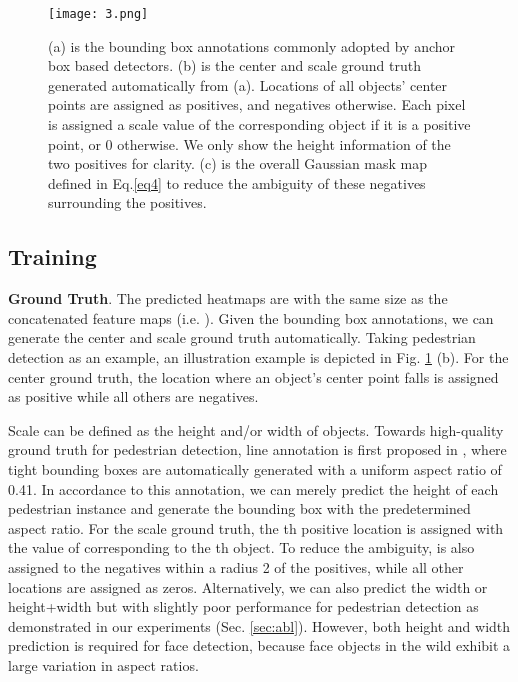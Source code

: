 \begin{figure}[t]
\begin{center}
\texttt{[image: 3.png]}
\end{center}
   \caption{(a) is the bounding box annotations commonly adopted by anchor box based detectors. (b) is the center and scale ground truth generated automatically from (a). Locations of all objects' center points are assigned as positives, and negatives otherwise. Each pixel is assigned a scale value of the corresponding object if it is a positive point, or 0 otherwise. We only show the height information of the two positives for clarity. (c) is the overall Gaussian mask map  defined in Eq.\ref{eq4} to reduce the ambiguity of these negatives surrounding the positives.}
\label{fig:gt}
\end{figure}
\subsection{Training}
\textbf{Ground Truth}.
The predicted heatmaps are with the same size as the concatenated feature maps (i.e.  ). Given the bounding box annotations, we can generate the center and scale ground truth automatically. Taking pedestrian detection as an example, an illustration example is depicted in Fig. \ref{fig:gt} (b). For the center ground truth, the location where an object's center point falls is assigned as positive while all others are negatives.

Scale can be defined as the height and/or width of objects.
Towards high-quality ground truth for pedestrian detection, line annotation is first proposed in \cite{zhang2018towards,zhang2017citypersons}, where tight bounding boxes are automatically generated with a uniform aspect ratio of 0.41. In accordance to this annotation, we can merely predict the height of each pedestrian instance and generate the bounding box with the predetermined aspect ratio. For the scale ground truth, the th positive location is assigned with the value of  corresponding to the th object. To reduce the ambiguity,  is also assigned to the negatives within a radius 2 of the positives, while all other locations are assigned as zeros.
Alternatively, we can also predict the width or height+width but with slightly poor performance for pedestrian detection as demonstrated in our experiments (Sec. \ref{sec:abl}). However, both height and width prediction is required for face detection, because face objects in the wild exhibit a large variation in aspect ratios.

